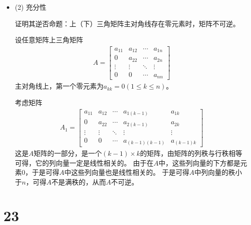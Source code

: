 \documentclass{article}
\begin{document}
\begin{itemize}
  \item (2) 充分性

        证明其逆否命题：上（下）三角矩阵主对角线存在零元素时，矩阵不可逆。

        设任意矩阵上三角矩阵
        \begin{align*}
          A = \begin{bmatrix}
                a_{11} & a_{12} & \cdots & a_{1n} \\
                0      & a_{22} & \cdots & a_{2n} \\
                \vdots & \vdots & \ddots & \vdots \\
                0      & 0      & \cdots & a_{nn}
              \end{bmatrix}
        \end{align*}
        主对角线上，第一个零元素为$a_{kk} = 0 (1 \leq k \leq n)$。

        考虑矩阵
        \begin{align*}
          A_1 = \begin{bmatrix}
                  a_{11} & a_{12} & \cdots & a_{1(k-1)}     & a_{1k}     \\
                  0      & a_{22} & \cdots & a_{2(k-1)}     & a_{2k}     \\
                  \vdots & \vdots & \ddots & \vdots         & \vdots     \\
                  0      & 0      & \cdots & a_{(k-1)(k-1)} & a_{(k-1)k}
                \end{bmatrix}
        \end{align*}
        这是$A$矩阵的一部分，是一个$(k - 1) \times k$的矩阵，由矩阵的列秩与行秩相等可得，它的列向量一定是线性相关的。
        由于在$A$中，这些列向量的下方都是元素$0$，于是可得$A$中这些列向量也是线性相关的。
        于是可得$A$中列向量的秩小于$n$，可得$A$不是满秩的，从而$A$不可逆。
\end{itemize}

\section*{23}
\end{document}
